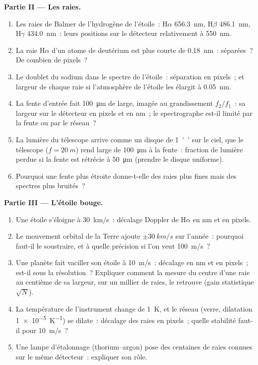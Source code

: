 \begin{problem}
\medskip
\noindent\textbf{Partie II --- Les raies.}
\begin{enumerate}[resume]
  \item Les raies de Balmer de l'hydrogène de l'étoile~: H$\alpha$ \qty{656.3}{nm},
        H$\beta$ \qty{486.1}{nm}, H$\gamma$ \qty{434.0}{nm}~: leurs positions sur le
        détecteur relativement à \qty{550}{nm}.
  \item La raie H$\alpha$ d'un atome de deutérium est plus courte de \qty{0.18}{nm}~: séparées~?
        De combien de pixels~?
  \item Le doublet du sodium dans le spectre de l'étoile~: séparation en
        pixels~; et largeur de chaque raie si l'atmosphère de l'étoile
        les élargit à \qty{0.05}{nm}.
  \item La fente d'entrée fait \qty{100}{\micro m} de large, imagée au
        grandissement $f_2/f_1$~: sa largeur sur le détecteur en pixels et
        en nm~; le spectrographe est-il limité par la fente ou par le réseau~?
  \item La lumière du télescope arrive comme un disque de \qty{1}{''} sur
        le ciel, que le télescope ($f = \qty{20}{m}$) rend large de \qty{100}{\micro m}
        à la fente~: fraction de lumière perdue si la fente est
        rétrécie à \qty{50}{\micro m} (prendre le disque uniforme).
  \item Pourquoi une fente plus étroite donne-t-elle des raies plus fines mais des
        spectres plus bruités~?
\end{enumerate}

\medskip
\noindent\textbf{Partie III --- L'étoile bouge.}
\begin{enumerate}[resume]
  \item Une étoile s'éloigne à \qty{30}{km/s}~: décalage Doppler de H$\alpha$ en nm
        et en pixels.
  \item Le mouvement orbital de la Terre ajoute $\pm\qty{30}{km/s}$ sur l'année~:
        pourquoi faut-il le soustraire, et à quelle précision si l'on veut
        \qty{100}{m/s}~?
  \item Une planète fait vaciller son étoile à \qty{10}{m/s}~: décalage en nm et
        en pixels~; est-il sous la résolution~? Expliquer comment la mesure du
        centre d'une raie au centième de sa largeur, sur un
        millier de raies, le retrouve (gain statistique $\sqrt{N}$).
  \item La température de l'instrument change de \qty{1}{K}, et le
        réseau (verre, dilatation \qty{1e-5}{K^{-1}}) se dilate~: décalage des
        raies en pixels~; quelle stabilité faut-il pour \qty{10}{m/s}~?
  \item Une lampe d'étalonnage (thorium--argon) pose des centaines de raies connues
        sur le même détecteur~: expliquer son rôle.
\end{enumerate}


\end{problem}
